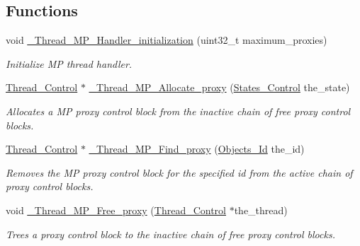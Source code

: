 \subsection*{Functions}
\begin{DoxyCompactItemize}
\item 
void \mbox{\hyperlink{group__RTEMSScoreThreadMP_ga96f0434ad7036721909abeedd0322bba}{\+\_\+\+Thread\+\_\+\+M\+P\+\_\+\+Handler\+\_\+initialization}} (uint32\+\_\+t maximum\+\_\+proxies)
\begin{DoxyCompactList}\small\item\em Initialize MP thread handler. \end{DoxyCompactList}\item 
\mbox{\hyperlink{struct__Thread__Control}{Thread\+\_\+\+Control}} $\ast$ \mbox{\hyperlink{group__RTEMSScoreThreadMP_gaa0f7e564ad228364fb5bf36163bdaefe}{\+\_\+\+Thread\+\_\+\+M\+P\+\_\+\+Allocate\+\_\+proxy}} (\mbox{\hyperlink{group__RTEMSScoreStates_gaeebbea0bfca162709b124fd519cf99d3}{States\+\_\+\+Control}} the\+\_\+state)
\begin{DoxyCompactList}\small\item\em Allocates a MP proxy control block from the inactive chain of free proxy control blocks. \end{DoxyCompactList}\item 
\mbox{\hyperlink{struct__Thread__Control}{Thread\+\_\+\+Control}} $\ast$ \mbox{\hyperlink{group__RTEMSScoreThreadMP_ga6dbcb30a4cb121951088a85af42227e2}{\+\_\+\+Thread\+\_\+\+M\+P\+\_\+\+Find\+\_\+proxy}} (\mbox{\hyperlink{group__RTEMSScoreObject_ga5821f52a51072941bdd603e542d0863e}{Objects\+\_\+\+Id}} the\+\_\+id)
\begin{DoxyCompactList}\small\item\em Removes the MP proxy control block for the specified id from the active chain of proxy control blocks. \end{DoxyCompactList}\item 
\mbox{\label{group__RTEMSScoreThreadMP_gaf6fae1158c34ddc94d640819c4302516}} 
void \mbox{\hyperlink{group__RTEMSScoreThreadMP_gaf6fae1158c34ddc94d640819c4302516}{\+\_\+\+Thread\+\_\+\+M\+P\+\_\+\+Free\+\_\+proxy}} (\mbox{\hyperlink{struct__Thread__Control}{Thread\+\_\+\+Control}} $\ast$the\+\_\+thread)
\begin{DoxyCompactList}\small\item\em Trees a proxy control block to the inactive chain of free proxy control blocks. \end{DoxyCompactList}\item 

\end{DoxyCompactItemize}
